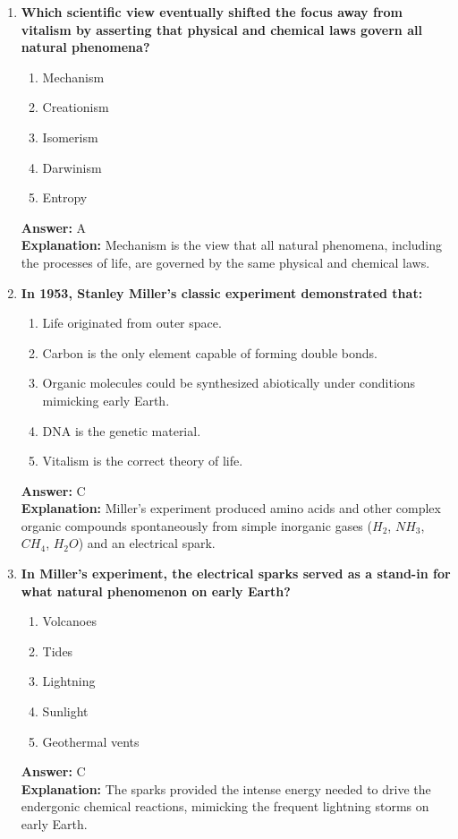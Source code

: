 \documentclass[11pt, a4paper]{article}
\begin{document}
\begin{enumerate}
\item \textbf{Which scientific view eventually shifted the focus away from vitalism by asserting that physical and chemical laws govern all natural phenomena?}
\begin{enumerate}[label=\Alph*.]
    \item Mechanism
    \item Creationism
    \item Isomerism
    \item Darwinism
    \item Entropy
\end{enumerate}
\textbf{Answer:} A \\
\textbf{Explanation:} Mechanism is the view that all natural phenomena, including the processes of life, are governed by the same physical and chemical laws.

\item \textbf{In 1953, Stanley Miller's classic experiment demonstrated that:}
\begin{enumerate}[label=\Alph*.]
    \item Life originated from outer space.
    \item Carbon is the only element capable of forming double bonds.
    \item Organic molecules could be synthesized abiotically under conditions mimicking early Earth.
    \item DNA is the genetic material.
    \item Vitalism is the correct theory of life.
\end{enumerate}
\textbf{Answer:} C \\
\textbf{Explanation:} Miller's experiment produced amino acids and other complex organic compounds spontaneously from simple inorganic gases ($H_2$, $NH_3$, $CH_4$, $H_2O$) and an electrical spark.

\item \textbf{In Miller's experiment, the electrical sparks served as a stand-in for what natural phenomenon on early Earth?}
\begin{enumerate}[label=\Alph*.]
    \item Volcanoes
    \item Tides
    \item Lightning
    \item Sunlight
    \item Geothermal vents
\end{enumerate}
\textbf{Answer:} C \\
\textbf{Explanation:} The sparks provided the intense energy needed to drive the endergonic chemical reactions, mimicking the frequent lightning storms on early Earth.


\end{enumerate}
\end{document}
